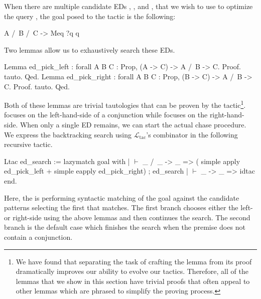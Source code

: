 \documentclass[preprint]{sigplanconf}
\newcommand{\ltac}[0]{\ensuremath{\mathcal{L}_{\mathrm{tac}}}}
\begin{document}
When there are multiple candidate EDs , , and , that we wish to use to optimize the query , the goal posed to the tactic is the following:
\begin{coq}
A /\ B /\ C -> Meq ?q q
\end{coq}

Two lemmas allow us to exhaustively search these EDs.
\begin{coq}
Lemma ed_pick_left : forall {A B C : Prop},
  (A -> C) -> A /\ B -> C.
Proof. tauto. Qed.
Lemma ed_pick_right : forall {A B C : Prop},
  (B -> C) -> A /\ B -> C.
Proof. tauto. Qed.
\end{coq}
Both of these lemmas are trivial tautologies that can be proven by the  tactic\footnote{We have found that separating the task of crafting the lemma from its proof dramatically improves our ability to evolve our tactics.
Therefore, all of the lemmas that we show in this section have trivial proofs that often appeal to other lemmas which are phrased to simplify the proving process.}.
 focuses on the left-hand-side of a conjunction while  focuses on the right-hand-side.
When only a single ED remains, we can start the actual chase procedure.
We express the backtracking search using \ltac's \coqe{+} combinator in the following recursive tactic.
\begin{coq}
Ltac ed_search :=
  lazymatch goal with
  | $\vdash$ _ /\ _ -> _ =>
    (  simple apply ed_pick_left
     + simple eapply ed_pick_right) ; ed_search
  | $\vdash$ _ -> _ => idtac
  end.
\end{coq}
Here, the  is performing syntactic matching of the goal against the candidate patterns selecting the first that matches.
The first branch chooses either the left- or right-side using the above lemmas and then continues the search.
The second branch is the default case which finishes the search when the premise does not contain a conjunction.

\end{document}
